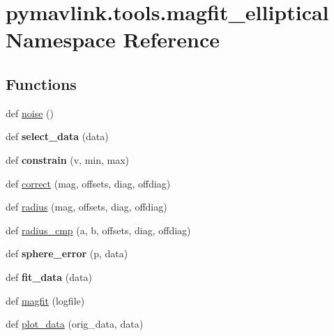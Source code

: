\hypertarget{namespacepymavlink_1_1tools_1_1magfit__elliptical}{}\section{pymavlink.\+tools.\+magfit\+\_\+elliptical Namespace Reference}
\label{namespacepymavlink_1_1tools_1_1magfit__elliptical}
\subsection*{Functions}
\begin{DoxyCompactItemize}
\item 
def \hyperlink{namespacepymavlink_1_1tools_1_1magfit__elliptical_a739fa4369b4770e3c0d3397590f468f2}{noise} ()
\item 
\mbox{\label{namespacepymavlink_1_1tools_1_1magfit__elliptical_aee3a351a012aa1e67eb9de0407ef7830}} 
def {\bfseries select\+\_\+data} (data)
\item 
\mbox{\label{namespacepymavlink_1_1tools_1_1magfit__elliptical_a400fcffd87709a20566085cd6bf5bc25}} 
def {\bfseries constrain} (v, min, max)
\item 
def \hyperlink{namespacepymavlink_1_1tools_1_1magfit__elliptical_a20fabb2795bcf794156ea4dcd0de400a}{correct} (mag, offsets, diag, offdiag)
\item 
def \hyperlink{namespacepymavlink_1_1tools_1_1magfit__elliptical_ad64337f0e7fad08ebdde9d99930c0c4b}{radius} (mag, offsets, diag, offdiag)
\item 
def \hyperlink{namespacepymavlink_1_1tools_1_1magfit__elliptical_a103d997042a9a3703cb39c2a9ae8cbf2}{radius\+\_\+cmp} (a, b, offsets, diag, offdiag)
\item 
\mbox{\label{namespacepymavlink_1_1tools_1_1magfit__elliptical_a4200efcc23a749e0d97aa8750c3cced9}} 
def {\bfseries sphere\+\_\+error} (p, data)
\item 
\mbox{\label{namespacepymavlink_1_1tools_1_1magfit__elliptical_a49f681dd9fd38c70a2fae3c88a9456a6}} 
def {\bfseries fit\+\_\+data} (data)
\item 
def \hyperlink{namespacepymavlink_1_1tools_1_1magfit__elliptical_a28ed55d76fd1e8ca62265a0001d3138c}{magfit} (logfile)
\item 
def \hyperlink{namespacepymavlink_1_1tools_1_1magfit__elliptical_a2a617907e38315cd4da32635d1a9805b}{plot\+\_\+data} (orig\+\_\+data, data)
\end{DoxyCompactItemize}
